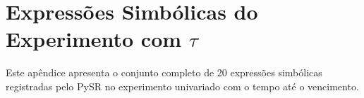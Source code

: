 \documentclass[12pt,twoside,final]{article}
\renewcommand{\listtablename}{LISTA TABELAS}
\renewcommand{\listfigurename}{LISTA  FIGURAS}
\begin{document}
\raggedbottom


\thispagestyle{empty}


\newpage

{\thispagestyle{empty}
\renewcommand{\listfigurename}{LISTA DE FIGURAS}

\listoffigures}
\newpage

{\thispagestyle{empty}
\renewcommand{\listtablename}{LISTA DE TABELAS}
\listoftables}
\newpage


\clearpage



\clearpage

\newpage


\tableofcontents

\newpage

\pagestyle{fancy}
\onehalfspacing

\newpage










{
\thispagestyle{empty}
\renewcommand{\refname}{REFERÊNCIAS}

}



\clearpage
\appendix

\section{Expressões Simbólicas do Experimento com \texorpdfstring{$\tau$}{tau}}
\label{ap:expressoes_tau}

Este apêndice apresenta o conjunto completo de
20 expressões simbólicas registradas pelo PySR
no experimento univariado com o tempo até o
vencimento.
\end{document}
